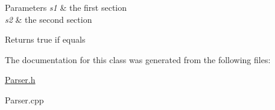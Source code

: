 \begin{DoxyParams}{Parameters}
{\em s1} & the first section \\
\hline
{\em s2} & the second section \\
\hline
\end{DoxyParams}
\begin{DoxyReturn}{Returns}
true if equals 
\end{DoxyReturn}


The documentation for this class was generated from the following files\-:\begin{DoxyCompactItemize}
\item 
\hyperlink{a00117}{Parser.\-h}\item 
Parser.\-cpp\end{DoxyCompactItemize}
